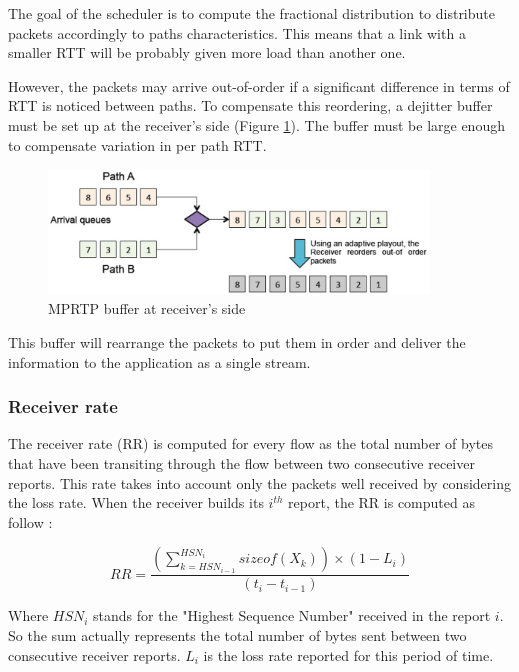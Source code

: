 The goal of the scheduler is to compute the fractional distribution to distribute packets accordingly to paths characteristics. This means that a link with a smaller RTT will be probably given more load than another one.

However, the packets may arrive out-of-order if a significant difference in terms of RTT is noticed between paths. To compensate this reordering, a dejitter buffer must be set up at the receiver's side (Figure \ref{fig:mprtp-dejitter}). The buffer must be large enough to compensate variation in per path RTT.

\begin{figure}[!h]
\centering
\includegraphics[width=0.9\textwidth]{images/mprtp-dejitter}
\caption{MPRTP buffer at receiver's side}
\label{fig:mprtp-dejitter}
\end{figure}

This buffer will rearrange the packets to put them in order and deliver the information to the application as a single stream.

\subsubsection{Receiver rate}

The receiver rate (RR) is computed for every flow as the total number of bytes that have been transiting through the flow between two consecutive receiver reports. This rate takes into account only the packets well received by considering the loss rate. When the receiver builds its $i^{th}$ report, the RR is computed as follow :

\begin{equation*}
RR = \frac{(\sum_{k = HSN_{i-1}}^{HSN_i} sizeof(X_k)) \times (1 - L_i)}{(t_i - t_{i-1})}
\end{equation*}

Where $HSN_i$ stands for the "Highest Sequence Number" received in the report $i$. So the sum actually represents the total number of bytes sent between two consecutive receiver reports. $L_i$ is the loss rate reported for this period of time.

